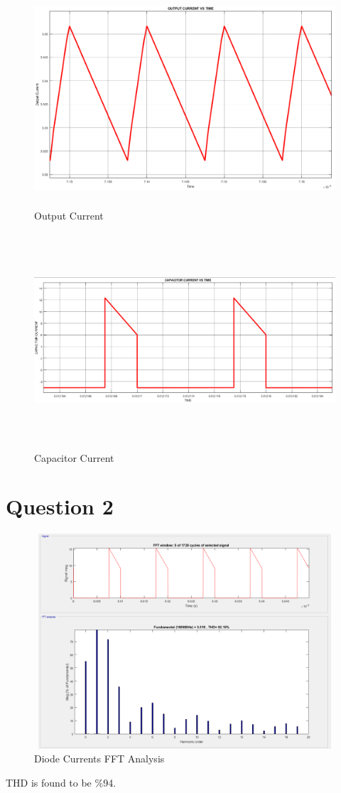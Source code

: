 \documentclass[oneside,12pt]{article}
\begin{document}
\begin{figure}[H]
	\centering
	\includegraphics[width=14cm, height=8cm]{q1/Iout}
	\caption{Output Current}
	\label{fig:iout}
\end{figure}
\begin{figure}[H]
	\centering
	\includegraphics[width=14cm, height=8cm]{q1/I_CAP}
	\caption{Capacitor Current}
	\label{fig:icap}
\end{figure}


\newpage
\section{Question 2}
\begin{figure}[H]
	\centering
	\includegraphics[width=14cm, height=8cm]{q2/HarmonikFFT}
	\caption{Diode Currents FFT Analysis}
	\label{fig:harmonikfft}
\end{figure}
THD is found to be \%94.
\end{document}
